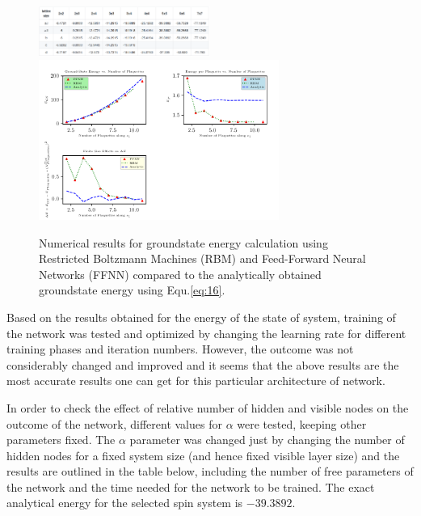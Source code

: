 \documentclass{article}
\begin{document}
\begin{figure}[!htb]
	\centering
	\includegraphics[width=0.5\textwidth]{./images/gs_tbl.png}
	\includegraphics[width=0.7\textwidth]{./images/plots.pdf}
	\caption{\label{tab:r_space} Numerical results for groundstate energy calculation using Restricted Boltzmann Machines (RBM) 
	and Feed-Forward Neural Networks (FFNN) compared to the analytically obtained groundstate energy using Equ.\hspace{0.2mm}\ref{eq:16}.} 
\end{figure}

Based on the results obtained for the energy of the state of system, training of the network was tested and optimized by changing the learning rate for different training phases and iteration numbers. However, the outcome was not considerably changed and improved and it seems that the above results are the most accurate results one can get for this particular architecture of network. 

In order to check the effect of relative number of hidden and visible nodes on the outcome of the network, different values for $\alpha$ were tested, keeping other parameters fixed. The $\alpha$ parameter was changed just by changing the number of hidden nodes for a fixed system size (and hence fixed visible layer size) and the results are outlined in the table below, including the number of free parameters of the network and the time needed for the network to be trained. The exact analytical energy for the selected spin system is $-39.3892$.
\end{document}
